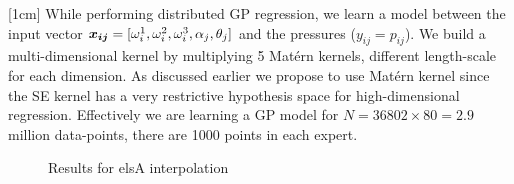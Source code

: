 [1cm]
While performing distributed GP regression, we learn a model between the input vector $\boldsymbol{x_{ij}} = [\omega_{i}^{1}, \omega_{i}^{2}, \omega_{i}^{3}, \alpha_j, \theta_j]$ and the pressures ($y_{ij} = p_{ij}$). We build a multi-dimensional kernel by multiplying 5 Mat\'ern kernels, different length-scale for each dimension. As discussed earlier we propose to use Mat\'ern kernel since the SE kernel has a very restrictive hypothesis space for high-dimensional regression.  Effectively we are learning a GP model for $N = 36802\times80 = 2.9$ million data-points, there are 1000 points in each expert. 

\begin{figure}[!ht]
  \centering
  \quad
  \caption{Results for elsA interpolation}
  \label{fig:FTF_CFDresults}
\end{figure}

